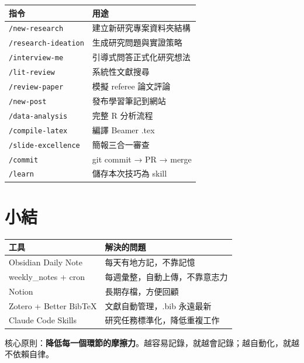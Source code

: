 \documentclass[12pt, a4paper]{article}
\begin{document}
\begin{tabularx}{\textwidth}{lX}
\toprule
\textbf{指令} & \textbf{用途} \\
\midrule
\texttt{/new-research} & 建立新研究專案資料夾結構 \\
\texttt{/research-ideation} & 生成研究問題與實證策略 \\
\texttt{/interview-me} & 引導式問答正式化研究想法 \\
\texttt{/lit-review} & 系統性文獻搜尋 \\
\texttt{/review-paper} & 模擬 referee 論文評論 \\
\texttt{/new-post} & 發布學習筆記到網站 \\
\texttt{/data-analysis} & 完整 R 分析流程 \\
\texttt{/compile-latex} & 編譯 Beamer .tex \\
\texttt{/slide-excellence} & 簡報三合一審查 \\
\texttt{/commit} & git commit → PR → merge \\
\texttt{/learn} & 儲存本次技巧為 skill \\
\bottomrule
\end{tabularx}

\section{小結}

\begin{tabularx}{\textwidth}{lX}
\toprule
\textbf{工具} & \textbf{解決的問題} \\
\midrule
Obsidian Daily Note & 每天有地方記，不靠記憶 \\
weekly\_notes + cron & 每週彙整，自動上傳，不靠意志力 \\
Notion & 長期存檔，方便回顧 \\
Zotero + Better BibTeX & 文獻自動管理，.bib 永遠最新 \\
Claude Code Skills & 研究任務標準化，降低重複工作 \\
\bottomrule
\end{tabularx}

核心原則：\textbf{降低每一個環節的摩擦力}。越容易記錄，就越會記錄；越自動化，就越不依賴自律。
\end{document}
